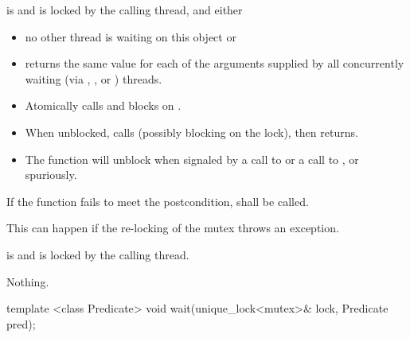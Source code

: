\begin{itemdescr}
\pnum
\requires {} is  and 
is locked by the calling thread, and either
\begin{itemize}
\item no other thread is waiting on this  object or
\item {} returns the same value for each of the 
arguments supplied by all concurrently waiting (via ,
, or ) threads.
\end{itemize}

\pnum\effects
\begin{itemize}
\item Atomically calls  and blocks on .
\item When unblocked, calls  (possibly blocking on the lock), then returns.
\item The function will unblock when signaled by a call to 
or a call to , or spuriously.
\end{itemize}

\pnum
\remarks
If the function fails to meet the postcondition, 
shall be called.
\begin{note} This can happen if the re-locking of the mutex throws an exception. \end{note}

\pnum
\postconditions {} is  and 
is locked by the calling thread.

\pnum\throws Nothing.

\end{itemdescr}

%
\begin{itemdecl}
template <class Predicate>
  void wait(unique_lock<mutex>& lock, Predicate pred);
\end{itemdecl}

